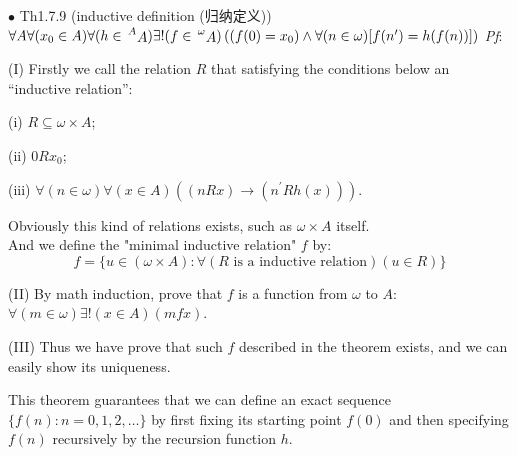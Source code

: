 \documentclass{article}
\begin{document}
\begin{Th}{$\bullet$ Th1.7.9 (inductive definition (归纳定义))}
    \textcolor{Th}{$\forall A\forall (x_0\in A)\forall (h\in\sideset{^A}{} {\mathop{A}})\exists!(f\in \sideset{^\omega}{} {\mathop{A}})\left((f(0) = x_0)\land \forall (n\in \omega)[f(n^\prime) = h(f(n))]\right)$}
    \tcblower
    \textit{Pf}: \begin{compactenum}
        \item[(I)] Firstly we call the relation $R$ that satisfying the conditions below an ``inductive relation'': \begin{compactenum}
            \item[(i)] $R\subseteq \omega\times A$;
            \item[(ii)] $0Rx_0$;
            \item[(iii)] $\forall (n\in \omega) \forall (x\in A) \left((nRx)\rightarrow (n^\prime R h(x))\right)$.
        \end{compactenum}
        Obviously this kind of relations exists, such as $\omega\times A$ itself.\\
        And we define the "minimal inductive relation" $f$ by:
        $$f = \{u\in (\omega\times A): \forall (R\text{ is a inductive relation})(u\in R)\}$$
        \item[(II)] By math induction, prove that $f$ is a function from $\omega$ to $A$: $\forall (m\in \omega)\exists!(x\in A)(mfx)$.
        \item[(III)] Thus we have prove that such $f$ described in the theorem exists, and we can easily show its uniqueness. 
    \end{compactenum}
\end{Th}
This theorem guarantees that we can define an exact sequence $\{f(n):n=0,1,2,\dots\}$ by first fixing its starting point $f(0)$ and then specifying $f(n)$ recursively by the recursion function $h$.
\end{document}
